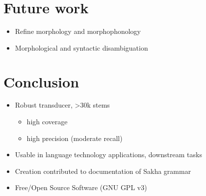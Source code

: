 \documentclass[a0paper,fleqn]{betterposter}
\begin{document}
{%
%

\section{Future work}

\vspace{-2em}
\begin{itemize}
    \item Refine morphology and morphophonology
    \item Morphological and syntactic disambiguation
\end{itemize}
\vspace{-0.5em}

\section{Conclusion}

\vspace{-2em}
\begin{itemize}
    \item Robust transducer, >30k stems
    \begin{itemize}
        \item high coverage
        \item high precision (moderate recall)
    \end{itemize}
    \item Usable in language technology applications, downstream tasks
    \item Creation contributed to documentation of Sakha grammar
    \item Free/Open Source Software (GNU GPL v3)
\end{itemize}

\vfill

}
\end{document}
